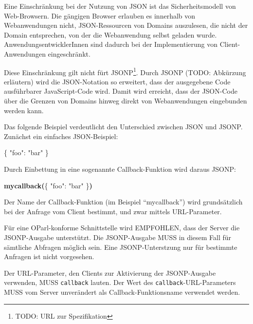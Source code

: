 \documentclass[,a4paper]{article}
\newenvironment{Shaded}{}{}
\newcommand{\DataTypeTok}[1]{\textcolor[rgb]{0.56,0.13,0.00}{{#1}}}
\newcommand{\StringTok}[1]{\textcolor[rgb]{0.25,0.44,0.63}{{#1}}}
\newcommand{\ErrorTok}[1]{\textcolor[rgb]{1.00,0.00,0.00}{\textbf{{#1}}}}
\newcommand{\NormalTok}[1]{{#1}}
\begin{document}
Eine Einschränkung bei der Nutzung von JSON ist das Sicherheitsmodell
von Web-Browsern. Die gängigen Browser erlauben es innerhalb von
Webanwendungen nicht, JSON-Ressourcen von Domains auszulesen, die nicht
der Domain entsprechen, von der die Webanwendung selbst geladen wurde.
AnwendungsentwicklerInnen sind dadurch bei der Implementierung von
Client-Anwendungen eingeschränkt.

Diese Einschränkung gilt nicht fürt JSONP\footnote{TODO: URL zur
  Spezifikation}. Durch JSONP (TODO: Abkürzung erläutern) wird die
JSON-Notation so erweitert, dass der ausgegebene Code ausführbarer
JavaScript-Code wird. Damit wird erreicht, dass der JSON-Code über die
Grenzen von Domains hinweg direkt von Webanwendungen eingebunden werden
kann.

Das folgende Beispiel verdeutlicht den Unterschied zwischen JSON und
JSONP. Zunächst ein einfaches JSON-Beispiel:

\begin{Shaded}
\begin{Highlighting}[]
\NormalTok{\{}
    \DataTypeTok{"foo"}\NormalTok{: }\StringTok{"bar"}
\NormalTok{\}}
\end{Highlighting}
\end{Shaded}

Durch Einbettung in eine sogenannte Callback-Funktion wird daraus JSONP:

\begin{Shaded}
\begin{Highlighting}[]
\ErrorTok{mycallback(}\NormalTok{\{}
    \DataTypeTok{"foo"}\NormalTok{: }\StringTok{"bar"}
\NormalTok{\}}\ErrorTok{)}
\end{Highlighting}
\end{Shaded}

Der Name der Callback-Funktion (im Beispiel ``mycallback'') wird
grundsätzlich bei der Anfrage vom Client bestimmt, und zwar mittels
URL-Parameter.

Für eine OParl-konforme Schnittstelle wird EMPFOHLEN, dass der Server
die JSONP-Ausgabe unterstützt. Die JSONP-Ausgabe MUSS in diesem Fall für
sämtliche Abfragen möglich sein. Eine JSONP-Unterstzung nur für
bestimmte Anfragen ist nicht vorgesehen.

Der URL-Parameter, den Clients zur Aktivierung der JSONP-Ausgabe
verwenden, MUSS \texttt{callback} lauten. Der Wert des
\texttt{callback}-URL-Parameters MUSS vom Server unverändert als
Callback-Funktionsname verwendet werden.
\end{document}
